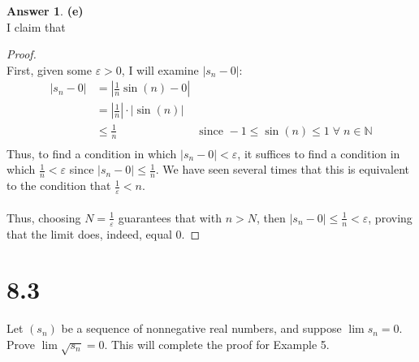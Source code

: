 \documentclass[10pt,a4paper]{article}
\theoremstyle{definition}
\newtheorem*{answer*}{Answer}
\begin{document}
\begin{answer*}{\textbf{(e)}}
\\I claim that 
\begin{proof}{$ $}
\\First, given some $\varepsilon > 0$, I will examine $\displaystyle |s_n - 0|$:
\begin{align*}
|s_n - 0| &= \left|\frac{1}{n}\sin(n) - 0\right|\\
&= \left|\frac{1}{n}\right| \cdot |\sin(n)|\\
&\leq \frac{1}{n} &\text{since } -1 \leq \sin(n) \leq 1 \; \forall \; n \in \mathbb{N}\\
\end{align*}
Thus, to find a condition in which $|s_n - 0| < \varepsilon$, it suffices to find a condition in which $\displaystyle \frac{1}{n} < \varepsilon$ since $\displaystyle |s_n - 0| \leq \frac{1}{n}$. We have seen several times that this is equivalent to the condition that $\displaystyle \frac{1}{\varepsilon} < n$.\\
\\
Thus, choosing $\displaystyle N = \frac{1}{\varepsilon}$ guarantees that with $n > N$, then $\displaystyle |s_n - 0| \leq \frac{1}{n} < \varepsilon$, proving that the limit does, indeed, equal $0$.
\end{proof}
\end{answer*}

\section*{8.3}
Let $(s_n)$ be a sequence of nonnegative real numbers, and suppose $\lim s_n = 0$. Prove $\lim \sqrt{s_n} = 0$. This will complete the proof for Example 5.
\end{document}

